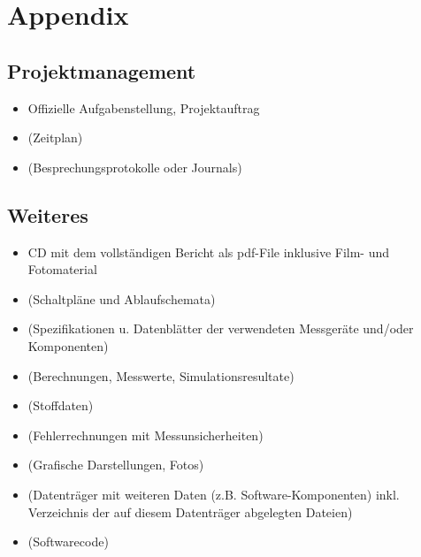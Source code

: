 %
%



\appendix
\chapter{Appendix}\label{chap.anhang}



\section{Projektmanagement}\label{projektmanagement}

\begin{itemize}
\item Offizielle Aufgabenstellung, Projektauftrag
\item (Zeitplan)
\item (Besprechungsprotokolle oder Journals)
\end{itemize}



\section{Weiteres}\label{weiteres}

\begin{itemize}
\item CD mit dem vollständigen Bericht als pdf-File inklusive Film- und Fotomaterial
\item (Schaltpläne und Ablaufschemata)
\item (Spezifikationen u. Datenblätter der verwendeten Messgeräte und/oder Komponenten)
\item (Berechnungen, Messwerte, Simulationsresultate)
\item (Stoffdaten)
\item (Fehlerrechnungen mit Messunsicherheiten)
\item (Grafische Darstellungen, Fotos)
\item (Datenträger mit weiteren Daten (z.B. Software-Komponenten) inkl. Verzeichnis der auf diesem Datenträger abgelegten Dateien)
\item (Softwarecode)
\end{itemize}



